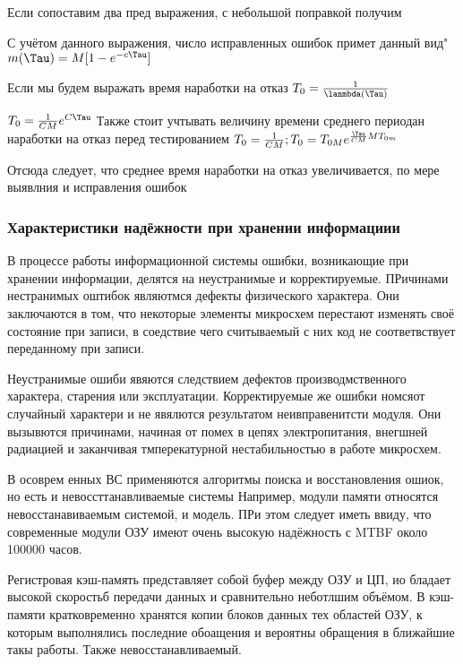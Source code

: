 \documentclass[a4paper, 12pt]{extarticle}
\begin{document}
	Если сопоставим два пред выражения, с небольшой поправкой получим


	С учётом данного выражения, число исправленных ошибок примет данный вид" $m(\Tau) = M[1-e^{-c\Tau}]$

	Если мы будем выражать время наработки на отказ $T_0 = \frac{1}{\lanmbda(\Tau)}$

	$T_0 = \frac{1}{CM}e^{C\Tau}$
	Также стоит учтывать величину времени среднего периодан наработки на отказ перед тестированием $T_0 = \frac{1}{CM};T_0 = T_{0M} e^{\frac{\Tau}{CM}{MT_{0m}}}$

	Отсюда следует, что среднее время наработки на отказ увеличивается, по мере выявлния и исправления ошибок




	\subsubsection{Характеристики надёжности при хранении информациии}

	В процессе работы информационной системы ошибки, возникающие при хранении информации, делятся на неустранимые и корректируемые. ПРичинами нестранимых оштибок являютмся дефекты физического характера. Они заключаются в том, что некоторые элементы микросхем перестают изменять своё состояние при записи, в соедствие чего считываемый с них код не соответвствует переданному при записи.

	Неустранимые ошиби явяются следствием дефектов производмственного характера, старения или эксплуатации. Корректируемые же ошибки номсяот случайный характери и не явялются результатом неивправенитсти модуля. Они вызывются причинами, начиная от помех в цепях электропитания, внегшней радиацией и заканчивая тмперекатурной нестабильностью в работе микросхем.

	В осоврем енных ВС применяются алгоритмы поиска и восстановления ошиок, но есть и невоссттанавливаемые системы Например, модули памяти относятся невосстанавиваемым системой, и модель. ПРи этом следует иметь ввиду, что современные модули ОЗУ имеют очень высокую надёжность с MTBF около 100000 часов.

	Регистровая кэш-память представляет собой буфер между ОЗУ и ЦП, ио бладает высокой скоростьб передачи данных и сравнительно неботлшим объёмом. В кэш-памяти кратковременно хранятся копии блоков данных тех областей ОЗУ, к которым выполнялись последние обоащения и вероятны обращения в ближайшие такы работы. Также невосстанавливаемый.
\end{document}
